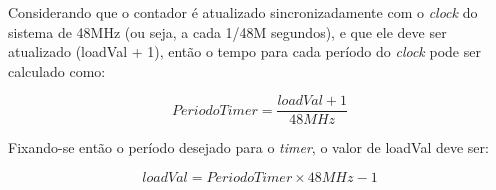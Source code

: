 Considerando que o contador é atualizado sincronizadamente com o \emph{clock} do sistema de 48MHz (ou seja, a cada 1/48M segundos), e que ele deve ser atualizado (loadVal + 1), então o tempo para cada período do \emph{clock} pode ser calculado como:

\begin{equation}
PeriodoTimer = \dfrac{loadVal + 1}{48MHz}
\end{equation}

Fixando-se então o período desejado para o \emph{timer}, o valor de loadVal deve ser:

\begin{equation}
loadVal = PeriodoTimer \times 48MHz - 1
\end{equation}
